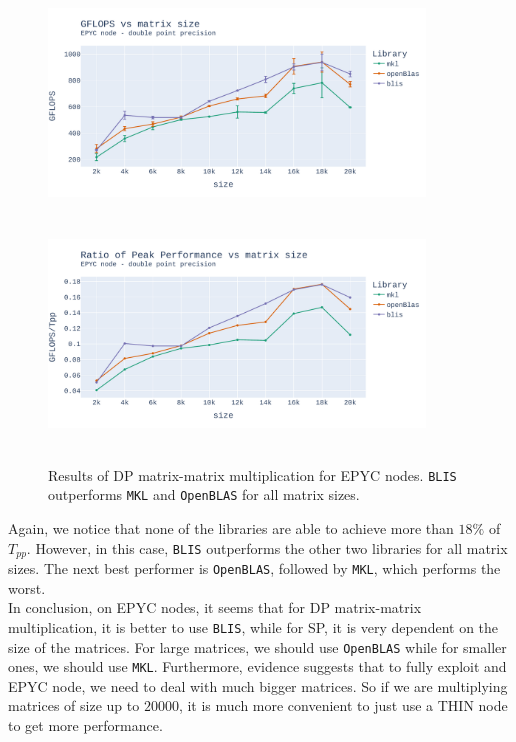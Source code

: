\documentclass{report}
\begin{document}
\begin{figure}[H]
\hspace*{-2.5cm}
\includegraphics[width=10cm, height=6cm]{./images/fixed_cores_epyc_double_gflops.pdf}
\includegraphics[width=10cm, height=6cm]{./images/fixed_cores_epyc_double_gflops_ratio.pdf}
\caption{\label{fig:fixed_cores_epyc_double} Results of DP matrix-matrix multiplication 
for EPYC nodes. \texttt{BLIS} outperforms \texttt{MKL} and \texttt{OpenBLAS} 
for all matrix sizes.}
\end{figure}

Again, we notice that none of the libraries are able to achieve more than $18\%$ 
of $T_{pp}$. However, in this case, \texttt{BLIS} outperforms the other two libraries 
for all matrix sizes. The next best performer is \texttt{OpenBLAS}, followed by 
\texttt{MKL}, which performs the worst.
\\

In conclusion, on EPYC nodes, it seems that for DP matrix-matrix multiplication, 
it is better to use \texttt{BLIS}, while for SP, it is very dependent on the 
size of the matrices. For large matrices, we should use \texttt{OpenBLAS}
while for smaller ones, we should use \texttt{MKL}. 
Furthermore, evidence suggests that to fully exploit and EPYC node, we need to 
deal with much bigger matrices. So if we are multiplying matrices of size up to 
$20000$, it is much more convenient to just use a THIN node to get more 
performance.
\end{document}
